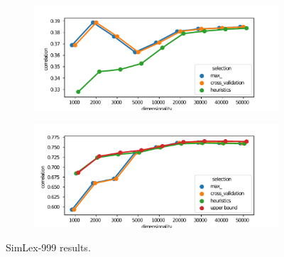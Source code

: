 \begin{figure}
  \centering

  \begin{subfigure}[t]{0.49\textwidth}
    \includegraphics[width=\textwidth]{supplement/figures/SimLex999-results}
    \caption{}
    \label{fig:SimLex999-results}
  \end{subfigure}
  \begin{subfigure}[t]{0.49\textwidth}
    \includegraphics[width=\textwidth]{supplement/figures/SimLex999-transfer}
    \caption{}
    \label{fig:fig:SimLex999-transfer}
  \end{subfigure}

  \caption{SimLex-999 results.}
  \label{fig:SimLex999}
\end{figure}

